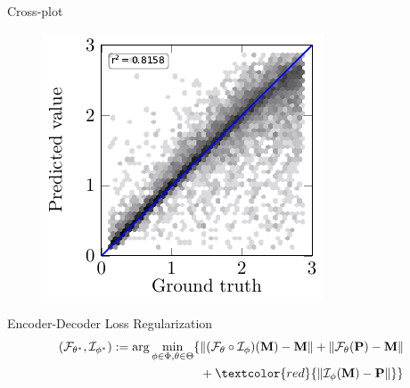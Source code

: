\begin{frame}{Cross-plot}
\begin{figure}[!h]
{		\hspace{0.1cm}
		\includegraphics[scale=0.8]{Diapos/DL_For_Inv/Figures/Syn_example/Cross_plots/Two_Step_loss/C_P_4/rho_u.pdf}
		}	
\end{figure}	
\end{frame}


\begin{frame}{Encoder-Decoder Loss Regularization}
\begin{equation}
\begin{aligned}
	(\mathcal{F}_{\theta^\ast}, \mathcal{I}_{\phi^\ast}):=\arg \min_{\phi \in \Phi, \theta \in \Theta} \{ & \|(\mathcal{F}_{\theta} \circ \mathcal{I}_{\phi})(\mathbf{M})-\mathbf{M}\| +\|{\cal F}_{\theta}({\bf P})-{\bf M}\|\\
	&  + \textcolor{red}{\|{\cal I}_{\phi}({\bf M})-{\bf P}\| } \}
\end{aligned}
\notag
\end{equation} \\
\vspace{0.2cm}

\begin{figure}[!h]
				\centering
\end{figure}

\begin{figure}[!h]
				\centering
\end{figure}
\end{frame}


